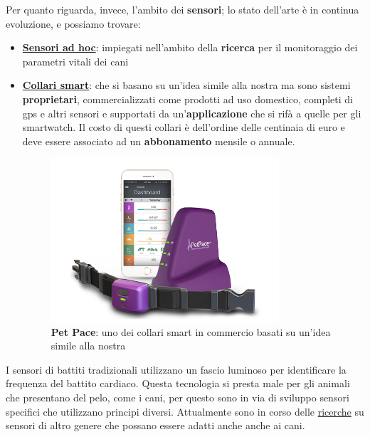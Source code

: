 Per quanto riguarda, invece, l'ambito dei \textbf{sensori}; lo stato dell'arte è in continua evoluzione, e possiamo trovare:
\begin{itemize}
    \item \textbf{\href{https://ciigar.csc.ncsu.edu/files/bib/Brugarolas2015-DogHeartMonitor.pdf}{Sensori ad hoc}}: impiegati nell'ambito della \textbf{ricerca} per il monitoraggio dei parametri vitali dei cani
    \item \textbf{\href{https://petpace.com/}{Collari smart}}: che si basano su un'idea simile alla nostra ma sono sistemi \textbf{proprietari}, commercializzati come prodotti ad uso domestico, completi di gps e altri sensori e supportati da un'\textbf{applicazione} che si rifà a quelle per gli smartwatch. Il costo di questi collari è dell'ordine delle centinaia di euro e deve essere associato ad un \textbf{abbonamento} mensile o annuale. 
    
    \begin{figure}[H]
        \label{fig:PetPace}
        \centering
        \includegraphics[width=0.8\textwidth]{Images/petpace.png}
         \caption{\textbf{Pet Pace}: uno dei collari smart in commercio basati su un'idea simile alla nostra}
    \end{figure}
\end{itemize}



I sensori di battiti tradizionali utilizzano un fascio luminoso per identificare la frequenza del battito cardiaco. Questa tecnologia si presta male per gli animali che presentano del pelo, come i cani, per questo sono in via di sviluppo sensori specifici che utilizzano principi diversi. Attualmente sono in corso delle
\href{https://vcs.vetmed.wsu.edu/research/clinical-studies/clinincal-studies-detail/vcs-clinical-studies/2017/06/28/new-ecg-technology}{ricerche} su sensori di altro genere che possano essere adatti anche anche ai cani.

